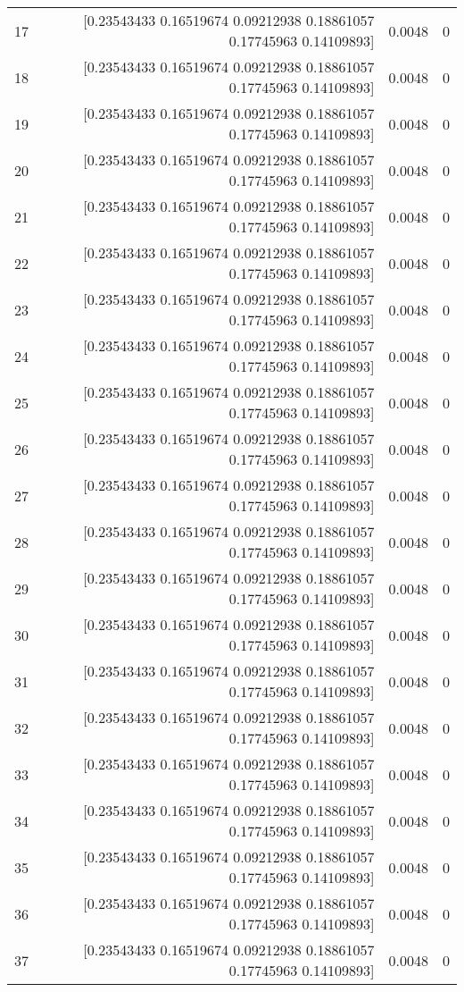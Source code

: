 \begin{longtable}{lrrr}
17 & [0.23543433 0.16519674 0.09212938 0.18861057 0.17745963 0.14109893] & 0.0048 & 0 \\
18 & [0.23543433 0.16519674 0.09212938 0.18861057 0.17745963 0.14109893] & 0.0048 & 0 \\
19 & [0.23543433 0.16519674 0.09212938 0.18861057 0.17745963 0.14109893] & 0.0048 & 0 \\
20 & [0.23543433 0.16519674 0.09212938 0.18861057 0.17745963 0.14109893] & 0.0048 & 0 \\
21 & [0.23543433 0.16519674 0.09212938 0.18861057 0.17745963 0.14109893] & 0.0048 & 0 \\
22 & [0.23543433 0.16519674 0.09212938 0.18861057 0.17745963 0.14109893] & 0.0048 & 0 \\
23 & [0.23543433 0.16519674 0.09212938 0.18861057 0.17745963 0.14109893] & 0.0048 & 0 \\
24 & [0.23543433 0.16519674 0.09212938 0.18861057 0.17745963 0.14109893] & 0.0048 & 0 \\
25 & [0.23543433 0.16519674 0.09212938 0.18861057 0.17745963 0.14109893] & 0.0048 & 0 \\
26 & [0.23543433 0.16519674 0.09212938 0.18861057 0.17745963 0.14109893] & 0.0048 & 0 \\
27 & [0.23543433 0.16519674 0.09212938 0.18861057 0.17745963 0.14109893] & 0.0048 & 0 \\
28 & [0.23543433 0.16519674 0.09212938 0.18861057 0.17745963 0.14109893] & 0.0048 & 0 \\
29 & [0.23543433 0.16519674 0.09212938 0.18861057 0.17745963 0.14109893] & 0.0048 & 0 \\
30 & [0.23543433 0.16519674 0.09212938 0.18861057 0.17745963 0.14109893] & 0.0048 & 0 \\
31 & [0.23543433 0.16519674 0.09212938 0.18861057 0.17745963 0.14109893] & 0.0048 & 0 \\
32 & [0.23543433 0.16519674 0.09212938 0.18861057 0.17745963 0.14109893] & 0.0048 & 0 \\
33 & [0.23543433 0.16519674 0.09212938 0.18861057 0.17745963 0.14109893] & 0.0048 & 0 \\
34 & [0.23543433 0.16519674 0.09212938 0.18861057 0.17745963 0.14109893] & 0.0048 & 0 \\
35 & [0.23543433 0.16519674 0.09212938 0.18861057 0.17745963 0.14109893] & 0.0048 & 0 \\
36 & [0.23543433 0.16519674 0.09212938 0.18861057 0.17745963 0.14109893] & 0.0048 & 0 \\
37 & [0.23543433 0.16519674 0.09212938 0.18861057 0.17745963 0.14109893] & 0.0048 & 0 \\

\end{longtable}
